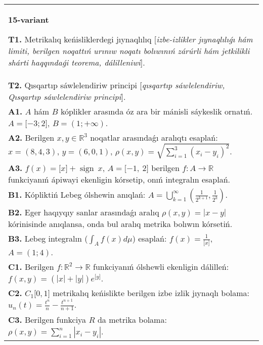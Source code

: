 \documentclass{article}
\DeclareMathOperator{\sign}{sign}
\begin{document}
\begin{tabular}{m{17cm}}
\textbf{15-variant}
\newline

\textbf{T1.} Metrikalıq keńisliklerdegi jıynaqlılıq [\textit{izbe-izlikler jıynaqlılıǵı hám limiti, berilgen noqattıń urınıw noqatı bolıwınıń zárúrli hám jetkilikli shárti haqqındaǵi teorema, dálilleniwi}]. \\
\textbf{T2.} Qısqartıp sáwlelendiriw principi [\textit{qısqartıp sáwlelendiriw, Qısqartıp sáwlelendiriw principi}]. \\
\textbf{A1.} \(A\) hám \(B\) kóplikler arasında óz ara bir mánisli sáykeslik ornatıń. \(A = \lbrack - 3;2\rbrack\), \(B = (1; + \infty)\). \\
\textbf{A2.} Berilgen \(x,y \in \mathbb{R}^{3}\) noqatlar arasındaǵı aralıqtı esaplań: \(x = (8,4,3)\), \(y = (6,0,1)\), \(\rho(x,y) = \sqrt{{\sum_{i = 1}^{3}\left( x_{i} - y_{i} \right)^{2}}}\). \\
\textbf{A3.} \(f(x) = \lbrack x\rbrack + \sign \ x\), \(A = \lbrack - 1,\ 2\rbrack\) berilgen \(f:A\rightarrow\mathbb{R}\) funkciyanıń ápiwayi ekenligin kórsetip, onıń integralın esaplań. \\
\textbf{B1.} Kópliktiń Lebeg ólshewin anıqlań: \(A = \bigcup_{k = 1}^{\infty}\left( \frac{1}{2^{k + 1}},\frac{1}{2^{k}} \right)\). \\
\textbf{B2.} Eger haqıyqıy sanlar arasındaǵı aralıq \(\rho(x,y) = |x - y|\) kórinisinde anıqlansa, onda bul aralıq metrika bolıwın kórsetiń. \\
\textbf{B3.} Lebeg integralın (\(\int_{A}^{}{f(x)d\mu}\)) esaplań: \(f(x) = \frac{1}{\lbrack x\rbrack}\), \(A = (1;4)\). \\
\textbf{C1.} Berilgen \(f:\mathbb{R}^{2}\mathbb{\rightarrow R}\) funkciyanıń ólshewli ekenligin dálilleń: \(f(x,y) = \left( |x| + |y| \right)e^{\lbrack y\rbrack}\). \\
\textbf{C2.} \(C_{1}\lbrack 0,1\rbrack\) metrikalıq keńislikte berilgen izbe izlik jıynaqlı bolama: \(u_{n}(t) = \frac{t^{n}}{n} - \frac{t^{n + 1}}{n + 1}\). \\
\textbf{C3.} Berilgen funkciya \(R\) da metrika bolama: \(\rho(x,y) = \sum_{i = 1}^{n}\left| x_{i} - y_{i} \right|\). \\

\end{tabular}
\vspace{1cm}
\end{document}
